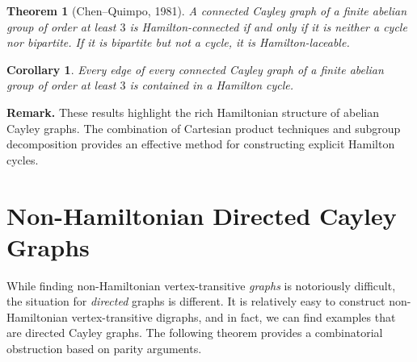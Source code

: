 \documentclass[12pt,a4paper,openany]{book}
\newtheorem{theorem}{Theorem}[section]
\newtheorem{corollary}{Corollary}[section]
\begin{document}
\begin{theorem}[Chen--Quimpo, 1981]\label{thm:CQ}
A connected Cayley graph of a finite abelian group of order at least $3$ is Hamilton-connected if and only if it is neither a cycle nor bipartite.  
If it is bipartite but not a cycle, it is Hamilton-laceable.
\end{theorem}

\begin{corollary}
Every edge of every connected Cayley graph of a finite abelian group of order at least $3$ is contained in a Hamilton cycle.
\end{corollary}

\noindent
\textbf{Remark.} These results highlight the rich Hamiltonian structure of abelian Cayley graphs. 
The combination of Cartesian product techniques and subgroup decomposition provides an effective method for constructing explicit Hamilton cycles.










\section{Non-Hamiltonian Directed Cayley Graphs}



While finding non-Hamiltonian vertex-transitive \emph{graphs} is notoriously difficult, the situation for \emph{directed} graphs is different. It is relatively easy to construct non-Hamiltonian vertex-transitive digraphs, and in fact, we can find examples that are directed Cayley graphs. The following theorem provides a combinatorial obstruction based on parity arguments.
\end{document}
